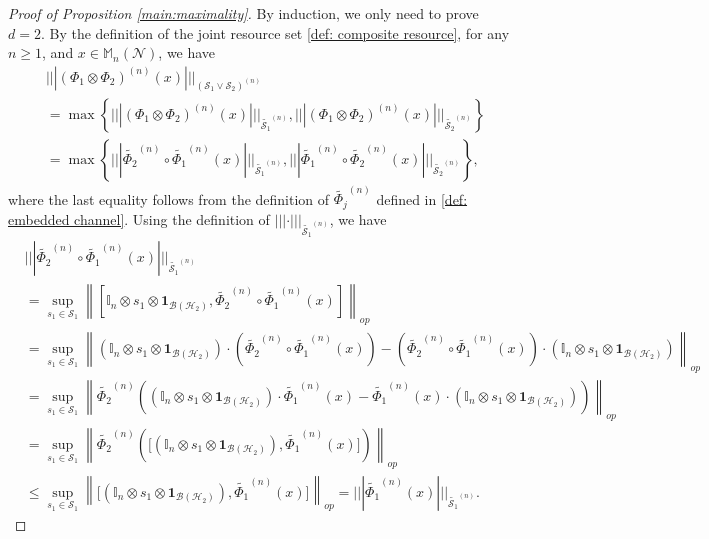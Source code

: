 \documentclass[11pt,reqno]{amsart}
\numberwithin{equation}{section}
\newcommand{\mb}{\mathbb}
\newcommand{\wt}{\widetilde}
\newcommand{\mc}{\mathcal}
\begin{document}
\begin{proof}[Proof of Proposition \ref{main:maximality}]
     By induction, we only need to prove $d =2$.
By the definition of the joint resource set \eqref{def: composite resource}, for any $n \ge 1$, and $x \in \mb M_n(\mc N)$, we have
\begin{align*}
    & ||| (\Phi_1 \otimes \Phi_2)^{(n)}(x)|||_{(\mc S_1 \vee \mc S_2)^{(n)}} \\
    & = \max \left\{||| (\Phi_1 \otimes \Phi_2)^{(n)}(x)|||_{\wt{\mc S_1}^{(n)}}, ||| (\Phi_1 \otimes \Phi_2)^{(n)}(x)|||_{\wt{\mc S_2}^{(n)}} \right\} \\
    & = \max \left\{||| \wt{\Phi_2}^{(n)} \circ \wt{\Phi_1}^{(n)}(x)|||_{\wt{\mc S_1}^{(n)}}, ||| \wt{\Phi_1}^{(n)} \circ \wt{\Phi_2}^{(n)}(x)|||_{\wt{\mc S_2}^{(n)}} \right\},
\end{align*}
where the last equality follows from the definition of $\wt{\Phi_j}^{(n)}$ defined in \eqref{def: embedded channel}. Using the definition of $|||\cdot|||_{\wt{\mc S_1}^{(n)}}$, we have
\begin{align*}
    & ||| \wt{\Phi_2}^{(n)} \circ \wt{\Phi_1}^{(n)}(x)|||_{\wt{\mc S_1}^{(n)}} \\
    & = \sup_{s_1\in \mc S_1} \left\|\left[\mb I_n  \otimes s_1 \otimes \textbf{1}_{\mc B(\mc H_2)}, \wt{\Phi_2}^{(n)} \circ \wt{\Phi_1}^{(n)}(x) \right]\right\|_{op} \\
    & = \sup_{s_1\in \mc S_1} \left\|(\mb I_n  \otimes s_1 \otimes \textbf{1}_{\mc B(\mc H_2)}) \cdot (\wt{\Phi_2}^{(n)} \circ \wt{\Phi_1}^{(n)}(x) )
 - (\wt{\Phi_2}^{(n)} \circ \wt{\Phi_1}^{(n)}(x) )\cdot (\mb I_n  \otimes s_1 \otimes \textbf{1}_{\mc B(\mc H_2)})\right\|_{op} \\
 & = \sup_{s_1\in \mc S_1} \left\|\wt{\Phi_2}^{(n)}\left( (\mb I_n  \otimes s_1 \otimes \textbf{1}_{\mc B(\mc H_2)}) \cdot \wt{\Phi_1}^{(n)}(x) 
 -  \wt{\Phi_1}^{(n)}(x) \cdot (\mb I_n  \otimes s_1 \otimes \textbf{1}_{\mc B(\mc H_2)}) \right)\right\|_{op} \\
 & = \sup_{s_1\in \mc S_1} \left\| \wt{\Phi_2}^{(n)}\left( \big[ (\mb I_n \otimes s_1 \otimes \textbf{1}_{\mc B(\mc H_2)}), \wt{\Phi_1}^{(n)}(x) \big]\right)  \right\|_{op} \\
 & \le \sup_{s_1\in \mc S_1} \left\| \big[ (\mb I_n  \otimes s_1 \otimes \textbf{1}_{\mc B(\mc H_2)}), \wt{\Phi_1}^{(n)}(x) \big]\right\|_{op} = |||\wt{\Phi_1}^{(n)}(x)|||_{\wt{\mc S_1}^{(n)}}.

\end{align*}
\end{proof}
\end{document}
